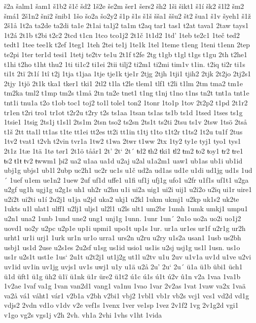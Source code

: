 š2a
šalm1
šam1
š1b2
š1č
šd2
1š2e
še2m
šer1
šers2
šh2
1ši
šikt1
š1í
šk2
š1l2
šm2
šmá1
2š1n2
šni2
šnib1
1šo
šo2a
šo2y2
š1p
š1s
š1š
šša1
ššu2
št2
šua1
š1v
šyeh1
š1ž
2š1å
1t2a
ta2de
ta2di
ta1e
2t1ai
ta1j2
ta1m
t2aq
tar1
tas1
t2at
tava1
2taw
tays1
1t2á
2t1b
t2bi
t2c2
2tcd
t1cn
1tco
tco1j2
2t1č
1t1d2
1td'
1teb
te2c1
1teč
ted2
tedt1
1tee
tee1k
t2ef
1teg1
1teh
2tei
te1j
1te1k
1tel
1teme
t1eng
1teni
t1enn
2tep
te2pi
1ter
ter1d
tesi1
1tetj
te2tv
te1u
2t1f
t2fe
2tg
t1gb
t1gl
t1gs
t1gu
2th
t2he1
t1hi
t2ho
t1ht
thu2
1ti
ti1c2
ti1ei
2tii
tilj2
ti2m1
ti2mi
tim1v
t1in.
t2iq
ti2r
ti1s
ti1t
2tï
2t1í
1tî
t2j
1tja
t1jaa
1tje
tje1k
tje1r
2tjg
2tjh
1tji1
tjih2
2tjk
2t2jo
2tj2s1
2tjy
1tjö
2t1k
tka1
tker1
tki1
2tl2
t1la
t2le
tlem1
tlf1
t2li
t1lm
2tm
tma2
tm1e
tm2ka
tml2
t1mp
tm2s
t1må
2tn
tn2e
tnet1
t1ng
t1nj
t1no
t1ns
tn2t
tnt1a
tnt1e
tnt1i
tnu1a
t2o
t1ob
toc1
toj2
to1l
tole1
ton2
1tonr
1to1p
1tov
2t2p2
t1pd
2t1r2
tr1en
t2ri
tro1
tr1ot
t2r2u
t2ry
t2s
ts1aa
1tsan
ts1as
ts1b
ts1d
1tsed
1tses
ts1g
1tsie1
1tsig
2ts1j
t1s1l
2ts1m
2tsn
tso2
ts2sn
2ts1t
ts2ti
2tsu
ts1v
2tsw
1tsö
2tså
t1š
2tt
tta1l
tt1as
t1te
tt1ei
tt2es
tt2i
tt1in
t1tj
t1to
t1t2r
t1ts2
1t2u
tu1f
2tus
1tv2
tvat1
t2vh
t2vin
tvr1a
1tw2
t1wa
2twr
t1ww
2tx
1ty2
ty1e
tyj1
tyo1
tys1
2t1z
1tæ
1tä
1tø
tør1
2t1ö
tåår1
2t'
2t`
2t´
ŧd2
ŧh2
ŧki1
ŧl2
ŧm2
ŧo2
ŧoy1
ŧr2
ŧre1
ŧs2
ŧ1ŧ
ŧv2
ŧwwm1
þi2
ua2
u1aa
ua1d
u2aj
u2al
u1a2m1
uaw1
ub1as
ub1i
ub1id
ubj1g
ubjs1
ub1l
2ubp
uc2h1
uc2r
uc1s
u1č
ud2a
ud1as
ud1e
u1di
ud1jg
ud1s
1ud´
1uef
u1em
ue1n2
1uew
2uf
uf1d
uffe1
u1fi
uf1j
ufj1g
ufo1
u2fr
u1f1s
uf1t1
u2ga
u2gf
ug1h
ugj1g
u2g1s
uh1
uh2r
u2hu
u1i
ui2a
uig1
ui2i
uij1
u2i2o
u2iq
ui1r
uire1
u2i2t
ui2ti
u1í
2u2j1
u1ja
u2jd
uka2
ukj1
u2kl
1ukm
ukmj1
u2kp
uk1s2
uk2te
1ukts
u1l
ulat1
ulff1
u2lj1
uljs1
ul2l1
u2ls
ult1
um2br
1umh
1umk
umkj1
umpu1
u2n1
una2
1unb
1und
une2
ung1
unj1g
1unn.
1unr
1un´
2u1o
uo2a
uo2i
uo1j2
uovd1
uo2y
u2pc
u2p1e
up1i
upmi1
upo1t
up1s
1ur.
ur1a
ur1es
ur1f
u2r1g
ur2h
urht1
ur1i
urj1
1urk
ur1n
ur1o
urra1
urs2n
u2ru
u2ry
u1s2a
usan1
1usb
us2bh
usbj1
us1d
2use
u2s1es
2u2sf
u1sg
us1id
usio1
us1is
u2sj
usj1g
us1l
1usn.
us1o
us1r
u2s1t
ust1e
1us`
2u1t
u2t2j1
ut1j2g
ut1l
u2tv
u1u
2uv
u1v1a
uv1d
u1ve
u2vi
uv1id
uv1in
uv1jg
uvjs1
uv1s
uwj1
u1y
u1ä
u2å
2u'
2u`
2u´
ü1a
ü1b
übi1
üch1
ü1d
üft1
ü1g
üh2
ü1ï
ü1nk
ü1r
üre2
ü1t2
ú1c
ú1s
ú1t
ú2v
û1n
v2a
1vaa
1va1b
1v2ae
1vaf
va1g
1van
van2d1
vang1
va1nu
1vao
1var
2v2as
1vat
1vaw
va2x
1vaä
va2å
vá1
váht1
vár1
v2b1a
v2bh
v2bi1
vbj2
1vbl1
vb1r
vb2s
vcj1
vcs1
vd2d
vd1g
vdjs2
2vdn
vd1o
v1dv
v2e
vef1s
1venx
1ver
ve1sp
1vez
2v1f2
1vg
2v1g2d
vgi1
v1go
vg2s
vgs1j
v2h
2vh.
vh1a
2vhi
1vhs
v1ht
1vida
